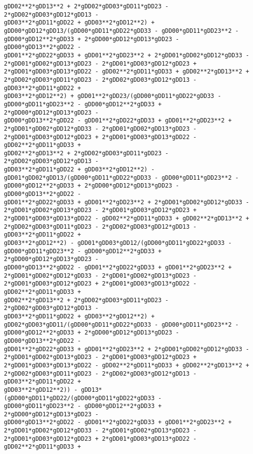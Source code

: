 \documentclass[landscape,letterpaper,10pt,english]{article}
\begin{document}
\begin{Verbatim}[commandchars=\\\{\}]
gDD02**2*gDD13**2 + 2*gDD02*gDD03*gDD11*gDD23 - 2*gDD02*gDD03*gDD12*gDD13 -
gDD03**2*gDD11*gDD22 + gDD03**2*gDD12**2) +
gDD00*gDD12*gDD13/(gDD00*gDD11*gDD22*gDD33 - gDD00*gDD11*gDD23**2 -
gDD00*gDD12**2*gDD33 + 2*gDD00*gDD12*gDD13*gDD23 - gDD00*gDD13**2*gDD22 -
gDD01**2*gDD22*gDD33 + gDD01**2*gDD23**2 + 2*gDD01*gDD02*gDD12*gDD33 -
2*gDD01*gDD02*gDD13*gDD23 - 2*gDD01*gDD03*gDD12*gDD23 +
2*gDD01*gDD03*gDD13*gDD22 - gDD02**2*gDD11*gDD33 + gDD02**2*gDD13**2 +
2*gDD02*gDD03*gDD11*gDD23 - 2*gDD02*gDD03*gDD12*gDD13 - gDD03**2*gDD11*gDD22 +
gDD03**2*gDD12**2) + gDD01**2*gDD23/(gDD00*gDD11*gDD22*gDD33 -
gDD00*gDD11*gDD23**2 - gDD00*gDD12**2*gDD33 + 2*gDD00*gDD12*gDD13*gDD23 -
gDD00*gDD13**2*gDD22 - gDD01**2*gDD22*gDD33 + gDD01**2*gDD23**2 +
2*gDD01*gDD02*gDD12*gDD33 - 2*gDD01*gDD02*gDD13*gDD23 -
2*gDD01*gDD03*gDD12*gDD23 + 2*gDD01*gDD03*gDD13*gDD22 - gDD02**2*gDD11*gDD33 +
gDD02**2*gDD13**2 + 2*gDD02*gDD03*gDD11*gDD23 - 2*gDD02*gDD03*gDD12*gDD13 -
gDD03**2*gDD11*gDD22 + gDD03**2*gDD12**2) -
gDD01*gDD02*gDD13/(gDD00*gDD11*gDD22*gDD33 - gDD00*gDD11*gDD23**2 -
gDD00*gDD12**2*gDD33 + 2*gDD00*gDD12*gDD13*gDD23 - gDD00*gDD13**2*gDD22 -
gDD01**2*gDD22*gDD33 + gDD01**2*gDD23**2 + 2*gDD01*gDD02*gDD12*gDD33 -
2*gDD01*gDD02*gDD13*gDD23 - 2*gDD01*gDD03*gDD12*gDD23 +
2*gDD01*gDD03*gDD13*gDD22 - gDD02**2*gDD11*gDD33 + gDD02**2*gDD13**2 +
2*gDD02*gDD03*gDD11*gDD23 - 2*gDD02*gDD03*gDD12*gDD13 - gDD03**2*gDD11*gDD22 +
gDD03**2*gDD12**2) - gDD01*gDD03*gDD12/(gDD00*gDD11*gDD22*gDD33 -
gDD00*gDD11*gDD23**2 - gDD00*gDD12**2*gDD33 + 2*gDD00*gDD12*gDD13*gDD23 -
gDD00*gDD13**2*gDD22 - gDD01**2*gDD22*gDD33 + gDD01**2*gDD23**2 +
2*gDD01*gDD02*gDD12*gDD33 - 2*gDD01*gDD02*gDD13*gDD23 -
2*gDD01*gDD03*gDD12*gDD23 + 2*gDD01*gDD03*gDD13*gDD22 - gDD02**2*gDD11*gDD33 +
gDD02**2*gDD13**2 + 2*gDD02*gDD03*gDD11*gDD23 - 2*gDD02*gDD03*gDD12*gDD13 -
gDD03**2*gDD11*gDD22 + gDD03**2*gDD12**2) +
gDD02*gDD03*gDD11/(gDD00*gDD11*gDD22*gDD33 - gDD00*gDD11*gDD23**2 -
gDD00*gDD12**2*gDD33 + 2*gDD00*gDD12*gDD13*gDD23 - gDD00*gDD13**2*gDD22 -
gDD01**2*gDD22*gDD33 + gDD01**2*gDD23**2 + 2*gDD01*gDD02*gDD12*gDD33 -
2*gDD01*gDD02*gDD13*gDD23 - 2*gDD01*gDD03*gDD12*gDD23 +
2*gDD01*gDD03*gDD13*gDD22 - gDD02**2*gDD11*gDD33 + gDD02**2*gDD13**2 +
2*gDD02*gDD03*gDD11*gDD23 - 2*gDD02*gDD03*gDD12*gDD13 - gDD03**2*gDD11*gDD22 +
gDD03**2*gDD12**2)) - gDD13*(gDD00*gDD11*gDD22/(gDD00*gDD11*gDD22*gDD33 -
gDD00*gDD11*gDD23**2 - gDD00*gDD12**2*gDD33 + 2*gDD00*gDD12*gDD13*gDD23 -
gDD00*gDD13**2*gDD22 - gDD01**2*gDD22*gDD33 + gDD01**2*gDD23**2 +
2*gDD01*gDD02*gDD12*gDD33 - 2*gDD01*gDD02*gDD13*gDD23 -
2*gDD01*gDD03*gDD12*gDD23 + 2*gDD01*gDD03*gDD13*gDD22 - gDD02**2*gDD11*gDD33 +

\end{Verbatim}
\end{document}
